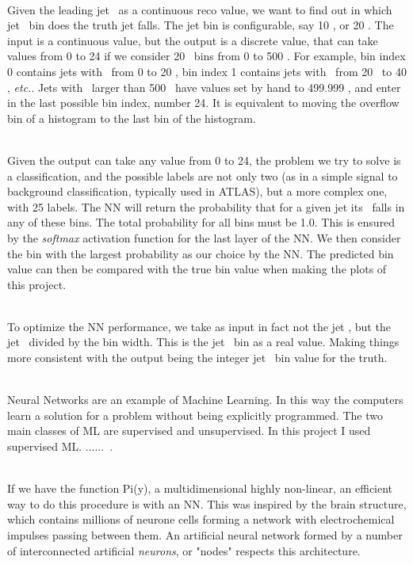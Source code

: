 \ \\Given the leading jet \pt~as a continuous reco value, we want to find out in which jet \pt~bin does the truth jet falls. The jet bin is configurable, say 10 \GeV, or 20 \GeV. The input is a continuous value, but the output is a discrete value, that can take values from 0 to 24 if we consider 20 \GeV~bins from 0 to 500 \GeV. For example, bin index 0 contains jets with \pt~from 0 to 20 \GeV, bin index 1 contains jets with \pt~from 20 \GeV~to 40 \GeV, \emph{etc.}. Jets with \pt~larger than 500 \GeV~have values set by hand to 499.999 \GeV, and enter in the last possible bin index, number 24. It is equivalent to moving the overflow bin of a histogram to the last bin of the histogram. 

\ \\Given the output can take any value from 0 to 24, the problem we try to solve is a classification, and the possible labels are not only two (as in a simple signal to background classification, typically used in ATLAS), but a more complex one, with 25 labels. The NN will return the probability that for a given jet its \pt~falls in any of these bins. The total probability for all bins must be 1.0. This is ensured by the \emph{softmax} activation function for the last layer of the NN. We then consider the bin with the largest probability as our choice by the NN. The predicted bin value can then be compared with the true bin value when making the plots of this project.

\ \\To optimize the NN performance, we take as input in fact not the jet \pt, but the jet \pt~divided by the bin width. This is the jet \pt~bin as a real value. Making things more consistent with the output being the integer jet \pt~bin value for the truth.

\ \\ Neural Networks are an example of Machine Learning. In this way the computers learn a solution for a problem without being explicitly programmed. The two main classes of ML are supervised and unsupervised. 
In this project I used supervised ML. ......~\cite{AndrewNg}.

\ \\If we have the function Pi(y), a multidimensional highly non-linear, an efficient way to do this procedure is with an NN. This was inspired by the brain structure, which contains millions of neurone cells forming a network with electrochemical impulses passing between them. An artificial neural network formed by a number of interconnected artificial \emph{neurons}, or "nodes" respects this architecture. 

